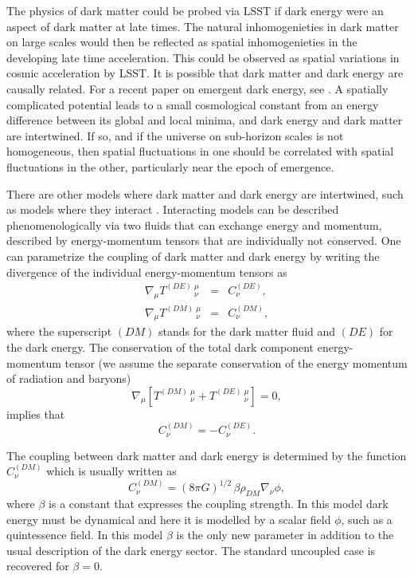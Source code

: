 \documentclass[modern,linenumbers]{aastex62}
\begin{document}
The physics of dark matter could be probed via LSST if dark energy were an aspect of dark matter at late times. 
The natural inhomogenieties in dark matter on large scales would then be reflected as spatial inhomogenieties in the developing late time acceleration. 
This could be observed as spatial variations in cosmic acceleration by LSST. 
It is possible that dark matter and dark energy are causally related. 
For a recent paper on emergent dark energy, see \cite{1801.09658}. 
A spatially complicated potential leads to a small cosmological constant from an energy difference between its global and local minima, and dark energy and dark matter are intertwined. 
If so, and if the universe on sub-horizon scales is not homogeneous, then spatial fluctuations in one should be correlated with spatial fluctuations in the other, particularly near the epoch of emergence.

There are other models where dark matter and dark energy are intertwined, such as models where they interact 
\citep{Amendola:1999er,Holden:1999hm}.
Interacting models can be described phenomenologically via two fluids that can exchange energy and momentum, 
described by energy-momentum tensors that are individually not conserved. One can parametrize the coupling of
dark matter and dark energy by writing the divergence of the individual energy-momentum tensors as 
\begin{eqnarray}
\nabla_{\mu} T^{(DE)}\,^{\mu}_{\nu} &=& C^{(DE)}_{\nu}, \label{cons_phi} \\
\nabla_{\mu} T^{(DM)}\,^{\mu}_{\nu} &=& C^{(DM)}_{\nu}, \label{cons_dm}
\end{eqnarray}
where the superscript $(DM)$ stands for the dark matter fluid and $(DE)$ for the dark energy.
The conservation of the total dark component energy-momentum tensor 
(we assume the separate conservation of the energy momentum of radiation and baryons)
\begin{equation}
\label{energyconservation}
\nabla_{\mu} \left[ T^{(DM)} \,^{\mu}_{\nu} + T^{(DE)} \,^{\mu}_{\nu} \right]= 0,
\end{equation}
implies that
\begin{equation}
C^{(DM)}_{\nu}=-C^{(DE)}_{\nu}.
\end{equation}

The coupling between dark matter and dark energy is determined by the function $C^{(DM)}_{\nu}$ which is usually
written as
\begin{equation}
C^{(DM)}_{\nu} = (8\pi G)^{1/2} \,\beta\rho_{DM}\nabla_{\nu} \phi,
\end{equation}
where $\beta$ is a constant that expresses the coupling strength. In this model dark energy must be dynamical and here it is modelled by a scalar field  $\phi$, such as a quintessence field.
In this model $\beta$ is the only new parameter in addition to the usual description of the dark energy sector.
The standard uncoupled case is recovered for $\beta=0$.
\end{document}
